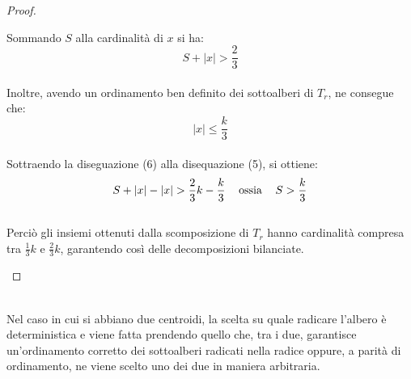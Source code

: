 \begin{proof}
\begin{itemize}
		Sommando $ S $ alla cardinalit\`a di $ x $ si ha:
		\\
		\begin{equation}
			S + |x| > \frac{2}{3}
		\end{equation}
		\\
		Inoltre, avendo un ordinamento ben definito dei sottoalberi di $ T_r $, ne consegue che:
		\\ 
		\begin{equation}
			|x| \le \frac{k}{3}
		\end{equation}
		\\
		Sottraendo la diseguazione (6) alla disequazione (5), si ottiene:
		\\
		\begin{equation}
			S + |x| - |x| > \frac{2}{3} k - \frac{k}{3} \hspace{0.3cm} \text{    ossia    }\hspace{0.3cm} S > \frac{k}{3}
		\end{equation}
		\\
		Perci\`o gli insiemi ottenuti dalla scomposizione di $T_r$ hanno cardinalit\`a compresa tra $\frac{1}{3} k$ e $\frac{2}{3} k$, garantendo cos\`i delle decomposizioni bilanciate.
	\end{itemize}
\end{proof}\mbox{}\\

	Nel caso in cui si abbiano due centroidi, la scelta su quale radicare l'albero  \`e deterministica e  viene fatta prendendo quello che, tra i due, garantisce un'ordinamento corretto dei sottoalberi radicati nella radice oppure, a parit\`a di ordinamento, ne viene scelto uno dei due in maniera arbitraria. 


